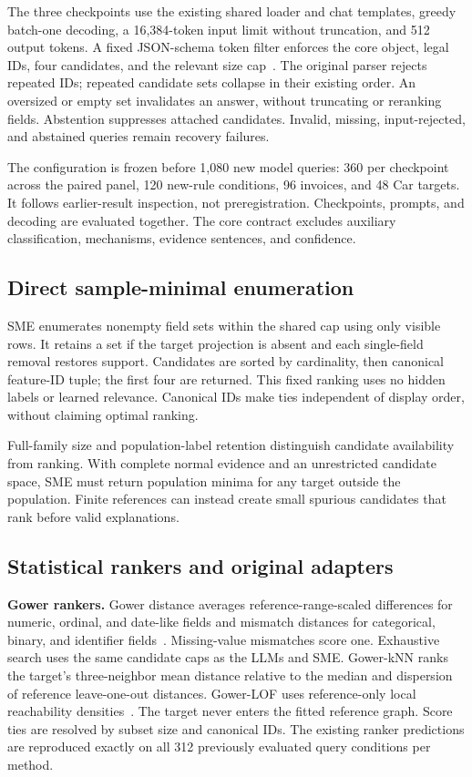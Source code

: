 \documentclass[conference]{IEEEtran}
\begin{document}
The three checkpoints use the existing shared loader and chat templates, greedy batch-one decoding, a 16,384-token input limit without truncation, and 512 output tokens. A fixed JSON-schema token filter enforces the core object, legal IDs, four candidates, and the relevant size cap~\cite{lmfe2026}. The original parser rejects repeated IDs; repeated candidate sets collapse in their existing order. An oversized or empty set invalidates an answer, without truncating or reranking fields. Abstention suppresses attached candidates. Invalid, missing, input-rejected, and abstained queries remain recovery failures.

The configuration is frozen before 1,080 new model queries: 360 per checkpoint across the paired panel, 120 new-rule conditions, 96 invoices, and 48 Car targets. It follows earlier-result inspection, not preregistration. Checkpoints, prompts, and decoding are evaluated together. The core contract excludes auxiliary classification, mechanisms, evidence sentences, and confidence.

\subsection{Direct sample-minimal enumeration}
SME enumerates nonempty field sets within the shared cap using only visible rows. It retains a set if the target projection is absent and each single-field removal restores support. Candidates are sorted by cardinality, then canonical feature-ID tuple; the first four are returned. This fixed ranking uses no hidden labels or learned relevance. Canonical IDs make ties independent of display order, without claiming optimal ranking.

Full-family size and population-label retention distinguish candidate availability from ranking. With complete normal evidence and an unrestricted candidate space, SME must return population minima for any target outside the population. Finite references can instead create small spurious candidates that rank before valid explanations.

\subsection{Statistical rankers and original adapters}
\textbf{Gower rankers.} Gower distance averages reference-range-scaled differences for numeric, ordinal, and date-like fields and mismatch distances for categorical, binary, and identifier fields~\cite{gower1971similarity}. Missing-value mismatches score one. Exhaustive search uses the same candidate caps as the LLMs and SME. Gower-kNN ranks the target's three-neighbor mean distance relative to the median and dispersion of reference leave-one-out distances. Gower-LOF uses reference-only local reachability densities~\cite{breunig2000lof}. The target never enters the fitted reference graph. Score ties are resolved by subset size and canonical IDs. The existing ranker predictions are reproduced exactly on all 312 previously evaluated query conditions per method.
\end{document}
